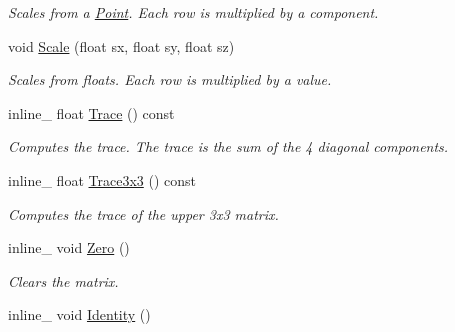 \begin{DoxyCompactItemize}
\begin{DoxyCompactList}\small\item\em Scales from a \hyperlink{class_point}{Point}. Each row is multiplied by a component. \end{DoxyCompactList}\item 
\hypertarget{class_matrix4x4_a693da88056c8a9a5721e99f2a3580ca2}{void \hyperlink{class_matrix4x4_a693da88056c8a9a5721e99f2a3580ca2}{Scale} (float sx, float sy, float sz)}\label{class_matrix4x4_a693da88056c8a9a5721e99f2a3580ca2}

\begin{DoxyCompactList}\small\item\em Scales from floats. Each row is multiplied by a value. \end{DoxyCompactList}\item 
\hypertarget{class_matrix4x4_a89d980f5744d581d314dd5e56e4b0fe3}{inline\+\_\+ float \hyperlink{class_matrix4x4_a89d980f5744d581d314dd5e56e4b0fe3}{Trace} () const }\label{class_matrix4x4_a89d980f5744d581d314dd5e56e4b0fe3}

\begin{DoxyCompactList}\small\item\em Computes the trace. The trace is the sum of the 4 diagonal components. \end{DoxyCompactList}\item 
\hypertarget{class_matrix4x4_a407415d11453cffbac03bcc98671c744}{inline\+\_\+ float \hyperlink{class_matrix4x4_a407415d11453cffbac03bcc98671c744}{Trace3x3} () const }\label{class_matrix4x4_a407415d11453cffbac03bcc98671c744}

\begin{DoxyCompactList}\small\item\em Computes the trace of the upper 3x3 matrix. \end{DoxyCompactList}\item 
\hypertarget{class_matrix4x4_aef42384cd995a5f1b1d7b00e4691614a}{inline\+\_\+ void \hyperlink{class_matrix4x4_aef42384cd995a5f1b1d7b00e4691614a}{Zero} ()}\label{class_matrix4x4_aef42384cd995a5f1b1d7b00e4691614a}

\begin{DoxyCompactList}\small\item\em Clears the matrix. \end{DoxyCompactList}\item 
\hypertarget{class_matrix4x4_a8161800bbc2eb0ea87a6065159cb71a5}{inline\+\_\+ void \hyperlink{class_matrix4x4_a8161800bbc2eb0ea87a6065159cb71a5}{Identity} ()}\label{class_matrix4x4_a8161800bbc2eb0ea87a6065159cb71a5}


\end{DoxyCompactItemize}
